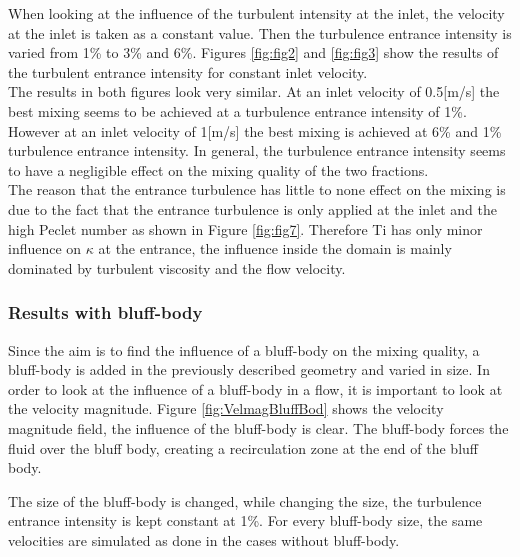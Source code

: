 \documentclass{CFD2017}
\begin{document}
When looking at the influence of the turbulent intensity at the inlet, the velocity at the inlet is taken as a constant value. Then the turbulence entrance intensity is varied from 1\% to 3\% and 6\%. Figures \ref{fig:fig2} and \ref{fig:fig3} show the results of the turbulent entrance intensity for constant inlet velocity.\\
The results in both figures look very similar. At an inlet velocity of 0.5[m/s] the best mixing seems to be achieved at a turbulence entrance intensity of 1\%. However at an inlet velocity of 1[m/s] the best mixing is achieved at 6\% and 1\% turbulence entrance intensity. In general, the turbulence entrance intensity seems to have a negligible effect on the mixing quality of the two fractions.\\
The reason that the entrance turbulence has little to none effect on the mixing is due to the fact that the entrance turbulence is only applied at the inlet and the high Peclet number as shown in Figure \ref{fig:fig7}.  Therefore Ti has only minor influence on $\kappa$ at the entrance, the influence inside the domain is mainly dominated by turbulent viscosity and the flow velocity. 





\subsubsection{Results with bluff-body }
Since the aim is to find the influence of a bluff-body on the mixing quality, a bluff-body is added in the previously described geometry and varied in size. In order to look at the influence of a bluff-body in a flow, it is important to look at the velocity magnitude. Figure \ref{fig:VelmagBluffBod} shows the velocity magnitude field, the influence of the bluff-body is clear. The bluff-body forces the fluid over the bluff body, creating a recirculation zone at the end of the bluff body.


The size of the bluff-body is changed, while changing the size, the turbulence entrance intensity is kept constant at 1\%. For every bluff-body size, the same velocities are simulated as done in the cases without bluff-body.
\end{document}
